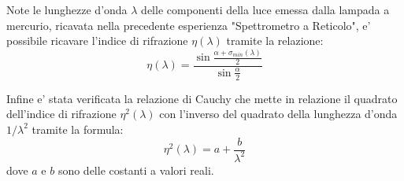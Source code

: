 Note le lunghezze d'onda $\lambda$ delle componenti della luce emessa dalla lampada a mercurio, ricavata nella precedente esperienza "Spettrometro a Reticolo", e' possibile ricavare l'indice di rifrazione $\eta (\lambda)$ tramite la relazione:
\[
	\eta (\lambda) = \frac{\sin{\frac{\alpha + \sigma_{min} (\lambda)}{2}}}{\sin{\frac{\alpha}{2}}}
\]

Infine e' stata verificata la relazione di Cauchy che mette in relazione il quadrato dell'indice di rifrazione $\eta^2 (\lambda)$ con l'inverso del quadrato della lunghezza d'onda $1/ \lambda^2$ tramite la formula:
\[
	\eta^2 (\lambda) = a + \frac{b}{\lambda^2}
\]
dove $a$ e $b$ sono delle costanti a valori reali.